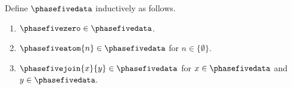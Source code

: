 \begin{datatype}\label{phase5_data}
    Define $\phasefivedata$ inductively as follows.
    \begin{enumerate}
        \item $\phasefivezero \in \phasefivedata$.
        \item $\phasefiveatom{n} \in \phasefivedata$ for $n \in \{\emptyset\}$.
        \item $\phasefivejoin{x}{y} \in \phasefivedata$ for $x \in \phasefivedata$ and $y \in \phasefivedata$.
    \end{enumerate}
\end{datatype}
